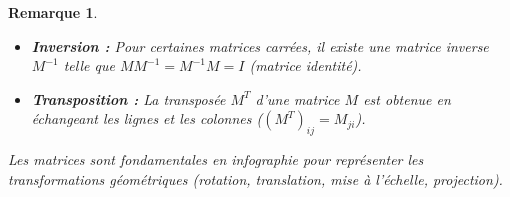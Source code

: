 \documentclass{article}
\newtheorem{remark}{Remarque}
\newtheorem{example}{Exemple}
\begin{document}
\begin{remark}
\begin{itemize}
\begin{itemize}
        \[ m_{ij} = \sum_{k=1}^{m} (m_1)_{ik} (m_2)_{kj} \quad (1 \le i \le n, 1 \le j \le p) \]
        \begin{example}[Produit Matrice-Matrice]
        \[ \begin{pmatrix} 1 & 3 \\ 7 & 9 \end{pmatrix} \times \begin{pmatrix} 2 & 4 \\ 6 & 8 \\ 10 & 12 \end{pmatrix} \quad \text{(impossible: dimensions incompatibles)} \]
        \[ \begin{pmatrix} 1 & 3 & 5 \\ 7 & 9 & 11 \end{pmatrix} \times \begin{pmatrix} 2 & 4 \\ 6 & 8 \\ 10 & 12 \end{pmatrix} = \begin{pmatrix} 1(2)+3(6)+5(10) & 1(4)+3(8)+5(12) \\ 7(2)+9(6)+11(10) & 7(4)+9(8)+11(12) \end{pmatrix} \]
        \[ = \begin{pmatrix} 2+18+50 & 4+24+60 \\ 14+54+110 & 28+72+132 \end{pmatrix} = \begin{pmatrix} 70 & 88 \\ 178 & 232 \end{pmatrix} \]
        \end{example}
    \end{itemize}
    \item \textbf{Inversion :} Pour certaines matrices carrées, il existe une matrice inverse $M^{-1}$ telle que $M M^{-1} = M^{-1} M = I$ (matrice identité).
    \item \textbf{Transposition :} La transposée $M^T$ d'une matrice $M$ est obtenue en échangeant les lignes et les colonnes ($ (M^T)_{ij} = M_{ji} $).
\end{itemize}
Les matrices sont fondamentales en infographie pour représenter les transformations géométriques (rotation, translation, mise à l'échelle, projection).
\end{remark}
\end{document}
